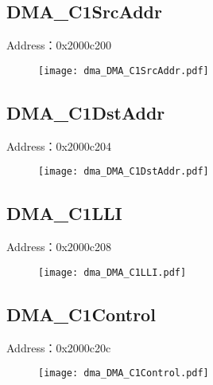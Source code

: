 \subsection{DMA\_C1SrcAddr}
\label{dma-DMA-C1SrcAddr}
Address：0x2000c200
 \begin{figure}[H]
\texttt{[image: dma\_DMA\_C1SrcAddr.pdf]}
\end{figure}

\subsection{DMA\_C1DstAddr}
\label{dma-DMA-C1DstAddr}
Address：0x2000c204
 \begin{figure}[H]
\texttt{[image: dma\_DMA\_C1DstAddr.pdf]}
\end{figure}

\subsection{DMA\_C1LLI}
\label{dma-DMA-C1LLI}
Address：0x2000c208
 \begin{figure}[H]
\texttt{[image: dma\_DMA\_C1LLI.pdf]}
\end{figure}

\subsection{DMA\_C1Control}
\label{dma-DMA-C1Control}
Address：0x2000c20c
 \begin{figure}[H]
\texttt{[image: dma\_DMA\_C1Control.pdf]}
\end{figure}


